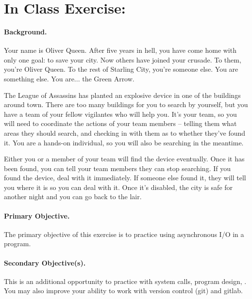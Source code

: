 




\section*{In Class Exercise: }

\paragraph{Background.}
Your name is Oliver Queen. After five years in hell, you have come home with only one goal: to save your city. Now others have joined your crusade. To them, you're Oliver Queen. To the rest of Starling City, you're someone else. You are something else. You are... the Green Arrow.

The League of Assassins has planted an explosive device in one of the buildings around town. There are too many buildings for you to search by yourself, but you have a team of your fellow vigilantes who will help you. It's your team, so you will need to coordinate the actions of your team members -- telling them what areas they should search, and checking in with them as to whether they've found it. You are a hands-on individual, so you will also be searching in the meantime.

Either you or a member of your team will find the device eventually. Once it has been found, you can tell your team members they can stop searching. If you found the device, deal with it immediately. If someone else found it, they will tell you where it is so you can deal with it. Once it's disabled, the city is safe for another night and you can go back to the lair.


\paragraph{Primary Objective.} The primary objective of this exercise is to practice using asynchronous I/O in a program.

\paragraph{Secondary Objective(s).} This is an additional opportunity to practice with system calls, program design, . You may also improve your ability to work with version control (git) and gitlab.

